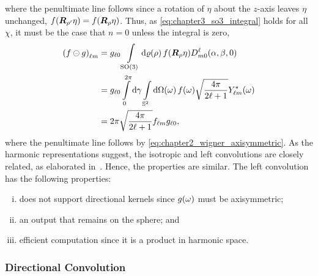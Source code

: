 %
where the penultimate line follows since a rotation of \({\eta}\) about the \(z\)-axis leaves \({\eta}\) unchanged, \ie{} \(f(\rotationMatrix[']\eta) = f(\rotationMatrix\eta)\).
Thus, as \cref{eq:chapter3_so3_integral} holds for all \(\chi{}\), it must be the case that \(n=0\) unless the integral is zero, \ie{}
%
\begin{align}
	\harmonic{(f \circleddash g)}
	 & = \axiHarmonic{g} \integrateRotation{\rho} f(\rotationMatrix\eta) \wigner{\ell}{m}{0} (\alpha,\beta,0) \nonumber{}                                    \\
	 & = \axiHarmonic{g} \int\limits_{0}^{2\pi} \dd{\gamma} \integrateSphere{\omega} \pixel{f} \sqrt{\inverseFactor} \pixel{\conj{\harmonic{Y}}} \nonumber{} \\
	 & = 2\pi \sqrt{\inverseFactor} \harmonic{f} \axiHarmonic{g},
\end{align}
%
where the penultimate line follows by \cref{eq:chapter2_wigner_axisymmetric}.
As the harmonic representations suggest, the isotropic and left convolutions are closely related, as elaborated in~\cite{Kennedy2011}.
Hence, the properties are similar.
The left convolution has the following properties:
%
\begin{enumerate}[(i),nosep,left=\parindent]
	\item does not support directional kernels since \(\pixel{g}\) must be axisymmetric;
	\item an output that remains on the sphere; and
	\item efficient computation since it is a product in harmonic space.
\end{enumerate}

\subsubsection{Directional Convolution}

